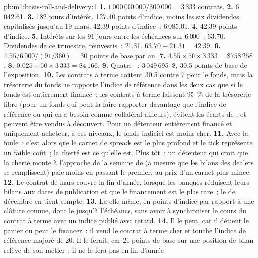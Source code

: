 \begin{solution}{pb:m1:basis-roll-and-delivery:1}
\textbf{1.} $1\,000\,000\,000/300\,000 = 3\,333$ contrats.
\textbf{2.} 6\,042.61.
\textbf{3.} 182 jours d'intérêt, 127.40 points d'indice, moins les six dividendes
capitalisés jusqu'au 19 mars, 42.39 points d'indice~: 6\,085.01.
\textbf{4.} 42.39 points d'indice.
\textbf{5.} Intérêts sur les 91 jours entre les échéances sur 6\,000~: 63.70.
Dividendes de ce trimestre, réinvestis~: 21.31. $63.70 - 21.31 = 42.39$.
\textbf{6.} $4.55/6\,000/(91/360) = 30$ points de base par an.
\textbf{7.} $4.55 \times 50 \times 3\,333 = \$758\,258$.
\textbf{8.} $0.025 \times 50 \times 3\,333 = \$4\,166$.
\textbf{9.} Quatre ~: 3\,049\,695~\$, 30.5 points de base de l'exposition.
\textbf{10.} Les contrats à terme coûtent 30.5 contre 7 pour le fonds, mais la trésorerie du fonds
ne rapporte l'indice de référence dans les deux cas que si le fonds est entièrement financé~; les contrats à terme
laissent 95~\% de la trésorerie libre (pour un fonds qui peut la faire rapporter davantage que l'indice de référence
ou qui en a besoin comme collatéral ailleurs), évitent les écarts de , et peuvent être vendus à découvert. Pour un détenteur entièrement financé et uniquement acheteur, à ces
niveaux, le fonds indiciel est moins cher.
\textbf{11.} Avec la foule~: c'est alors que le carnet de spreads est le plus profond et le
tick représente un faible coût~; la cherté est ce qu'elle est. Plus tôt~: un détenteur qui
croit que la cherté monte à l'approche de la semaine de  (à mesure que les bilans des dealers
se remplissent) paie moins en passant le premier, au prix d'un carnet plus mince.
\textbf{12.} Le contrat de mars couvre la fin d'année, lorsque les banques réduisent leurs
bilans aux dates de publication et que le financement est le plus rare~; le  de décembre
en tient compte.
\textbf{13.} La  elle-même, en points d'indice par rapport à une clôture connue, donc
le  jusqu'à l'échéance, sans avoir à synchroniser le cours du
contrat à terme avec un indice publié avec retard.
\textbf{14.} Il le peut, car il détient le panier ou peut le financer~: il vend
le contrat à terme cher et touche l'indice de référence majoré de 20. Il le ferait, car 20 points
de base sur une position de bilan relève de son métier~; il ne le fera pas en fin d'année

\end{solution}
